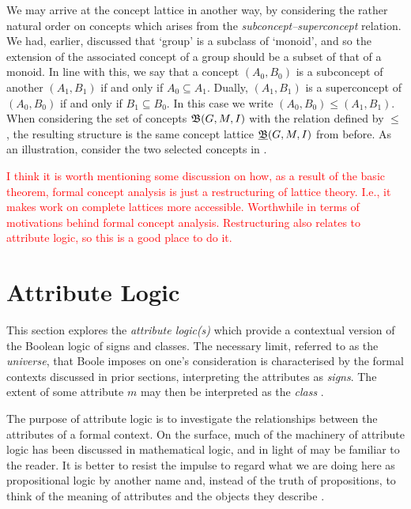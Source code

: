 We may arrive at the concept lattice in another way, by considering the rather natural order on concepts which arises
from the \textit{subconcept--superconcept} relation. We had, earlier, discussed that `group' is a subclass of `monoid', and
so the extension of the associated concept of a group should be a subset of that of a monoid. In line with this, we say that
a concept $(A_{0},B_{0})$ is a subconcept of another $(A_{1},B_{1})$ if and only if $A_{0}\subseteq A_{1}$. Dually, $(A_{1}
,B_{1})$ is a superconcept of $(A_{0},B_{0})$ if and only if $B_{1}\subseteq B_{0}$. In this case we write
$(A_{0},B_{0}) \leq (A_{1},B_{1})$. When considering the set of concepts ${\mathfrak B} (G,M,\mathrel{I})$ with the relation defined by $\leq$,
the resulting structure is the same concept lattice $\underline{{\mathfrak B}} (G,M,\mathrel{I})$ from before. As an illustration, consider the two selected
concepts in .

\textcolor{red}{I think it is worth mentioning some discussion on how, as a result of the basic theorem, formal concept analysis is just a restructuring of lattice theory. I.e., it makes work on complete lattices more accessible. Worthwhile in terms of motivations behind formal concept analysis. Restructuring also relates to attribute logic, so this is a good place to do it. }

\section{Attribute Logic}
\label{section:attribute-logic}

This section explores the \textit{attribute logic(s)} \cite{ganter1999contextual,ganter2025language} which provide a contextual
version of the Boolean logic of signs and classes. The necessary limit, referred to as the \textit{universe}, that Boole
imposes on one's consideration is characterised by the formal contexts discussed in prior sections, interpreting the
attributes as \textit{signs}. The extent of some attribute $m$ may then be interpreted as the \textit{class} \cite{Wille2000}.

The purpose of attribute logic is to investigate the relationships between the attributes of a formal context. On the
surface, much of the machinery of attribute logic has been discussed in mathematical logic, and in light of
 may be familiar to the reader. It is better to resist the impulse to regard what we are
doing here as propositional logic by another name and, instead of the truth of propositions, to think of the meaning of attributes
and the objects they describe \cite{ganter2025language}.

